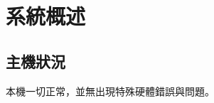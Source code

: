 \chapter{系統概述} %
\label{chapter1} %
\ifpdf
    \graphicspath{{Figures/chapter1/PNG/}{Figures/chapter1/PDF/}{Figures/chapter1/}}
\else
    \graphicspath{{Figures/chapter1/EPS/}{Figures/chapter1/}}
\fi


\section{主機狀況}\label{1_sec:define}
本機一切正常，並無出現特殊硬體錯誤與問題。